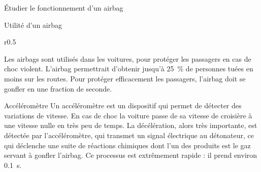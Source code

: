 \teteTermStssRout
{}

\begin{objectifs}
  \item Étudier le fonctionnement d'un airbag
\end{objectifs}


\begin{doc}{Utilité d'un airbag}
  \begin{wrapfigure}{r}{0.5\linewidth}  
    \centering
    \vspace*{-24pt}
     \\[4pt]
  \end{wrapfigure}
  
  Les airbags sont utilisés dans les voitures, pour protéger les passagers en cas de choc violent.
  L'airbag permettrait d'obtenir jusqu'à \qty{25}{\percent} de personnes tuées en moins sur les routes.
  Pour protéger efficacement les passagers, l'airbag doit se gonfler en une fraction de seconde.
\end{doc}

\begin{doc}{Accéléromètre}
  Un accéléromètre est un dispositif qui permet de détecter des variations de vitesse.
  En cas de choc la voiture passe de sa vitesse de croisière à une vitesse nulle en très peu de temps.
  La décélération, alors très importante, est détectée par l'accéléromètre, qui transmet un signal électrique au détonateur, ce qui déclenche une suite de réactions chimiques dont l'un des produits est le gaz servant à gonfler l'airbag.
  Ce processus est extrêmement rapide : il prend environ \qty{0,1}{\s}.
\end{doc}

